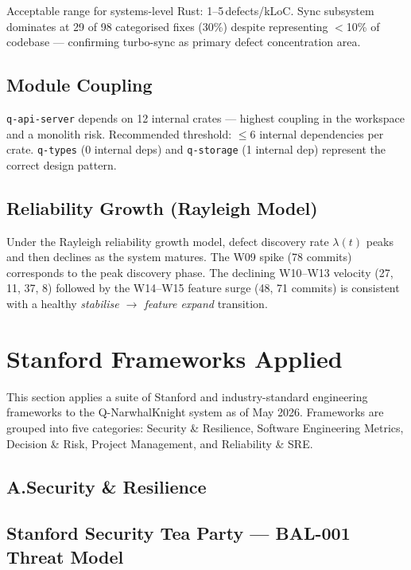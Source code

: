 \documentclass[12pt,a4paper]{article}
\begin{document}
Acceptable range for systems-level Rust: 1--5\,defects/kLoC.
Sync subsystem dominates at 29 of 98 categorised fixes (30\%) despite representing
$<$10\% of codebase — confirming turbo-sync as primary defect concentration area.

\subsection{Module Coupling}

\texttt{q-api-server} depends on 12 internal crates — highest coupling in the
workspace and a monolith risk. Recommended threshold: $\leq$6 internal dependencies
per crate. \texttt{q-types} (0 internal deps) and \texttt{q-storage} (1 internal dep)
represent the correct design pattern.

\subsection{Reliability Growth (Rayleigh Model)}

Under the Rayleigh reliability growth model, defect discovery rate $\lambda(t)$
peaks and then declines as the system matures.
The W09 spike (78 commits) corresponds to the peak discovery phase.
The declining W10--W13 velocity (27, 11, 37, 8) followed by the W14--W15 feature
surge (48, 71 commits) is consistent with a healthy \emph{stabilise $\to$ feature
expand} transition.

\section{Stanford Frameworks Applied}

This section applies a suite of Stanford and industry-standard engineering frameworks
to the Q-NarwhalKnight system as of May 2026. Frameworks are grouped into five
categories: Security \& Resilience, Software Engineering Metrics, Decision \& Risk,
Project Management, and Reliability \& SRE.

\subsection*{A.\enspace Security \& Resilience}

\subsection{Stanford Security Tea Party --- BAL-001 Threat Model}
\end{document}
